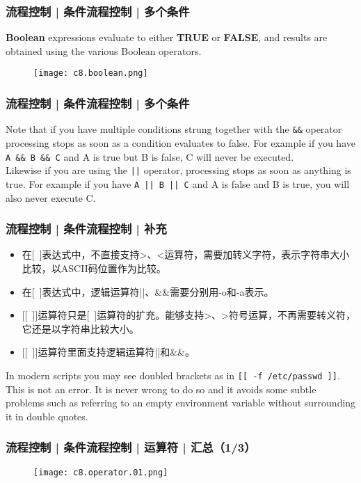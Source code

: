 \begin{frame}[fragile]
  \frametitle{流程控制 | 条件流程控制 | 多个条件}
  \textbf{Boolean} expressions evaluate to either \textbf{TRUE} or \textbf{FALSE}, and results are obtained using the various Boolean operators.
  \begin{figure}
    \centering
    \texttt{[image: c8.boolean.png]}
  \end{figure}
\end{frame}

\begin{frame}[fragile]
  \frametitle{流程控制 | 条件流程控制 | 多个条件}
  Note that if you have multiple conditions strung together with the \verb|&&| operator processing stops as soon as a condition evaluates to false.  For example if you have \verb|A && B && C| and A is true but B is false, C will never be executed.\\
  \vspace{0.3cm}
  Likewise if you are using the \verb=||= operator, processing stops as soon as anything is true. For example if you have \verb=A || B || C= and A is false and B is true, you will also never execute C.
\end{frame}

\begin{frame}[fragile]
  \frametitle{流程控制 | 条件流程控制 | 补充}
  \begin{itemize}
    \item 在[\ ]表达式中，不直接支持>、<运算符，需要加转义字符，表示字符串大小比较，以ASCII码位置作为比较。
    \item 在[\ ]表达式中，逻辑运算符||、\&\&需要分别用-o和-a表示。
    \item {[[}\ {]]}运算符只是[\ ]运算符的扩充。能够支持>、>符号运算，不再需要转义符，它还是以字符串比较大小。
    \item {[[}\ {]]}运算符里面支持逻辑运算符||和\&\&。
  \end{itemize}
  In modern scripts you may see doubled brackets as in \verb|[[ -f /etc/passwd ]]|. This is not an error. It is never wrong to do so and it avoids some subtle problems such as referring to an empty environment variable without surrounding it in double quotes.
\end{frame}

\begin{frame}
  \frametitle{流程控制 | 条件流程控制 | 运算符 | 汇总（1/3）}
  \begin{figure}
    \centering
    \texttt{[image: c8.operator.01.png]}
  \end{figure}
\end{frame}

